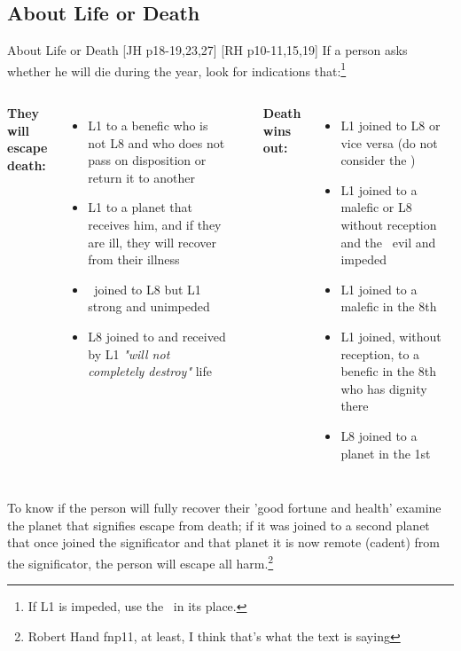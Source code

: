 \subsection{About Life or Death}
\begin{frame}[t]{About Life or Death [JH p18-19,23,27] [RH p10-11,15,19]}
If a person asks whether he will die during the year, look for indications that:\footnote{If L1 is impeded, use the \Moon\ in its place.}
\vspace{0.25cm}
\begin{columns}[T, onlytextwidth]
\textbf{They will escape death:}\\
\begin{itemize}
\item L1 to a benefic who is not L8 and who does not pass on disposition or return it to another 
\vspace{0.25cm}

\item L1 to a planet that receives him, and if they are ill, they will recover from their illness
\vspace{0.25cm}

\item \Moon\ joined to L8 but L1 strong and unimpeded
\item L8 joined to and received by L1 \textsl{"will not completely destroy"} life
\end{itemize}

\rule{.1mm}{.45\textheight}

\textbf{Death wins out:}\\
\begin{itemize}
\item L1 joined to L8 or vice versa (do not consider the \Moon) 
\item L1 joined to a malefic or L8 without reception and the \Moon\ evil and impeded
\item L1 joined to a malefic in the 8th
\item L1 joined, without reception, to a benefic in the 8th who has dignity there
\item L8 joined to a planet in the 1st
\end{itemize}
\end{columns}
\vspace{0.25cm}
To know if the person will fully recover their  'good fortune and health' examine the planet that signifies escape from death; if it was joined to a second planet that once joined the significator and that planet it is now remote (cadent) from the significator, the person will escape all harm.\footnote{Robert Hand fnp11, at least, I think that's what the text is saying}
\end{frame}
